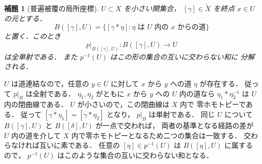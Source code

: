 \documentclass[a5paper,10pt,onecolumn]{jsarticle}
\makeatletter
\theoremstyle{mathnotetheorem}
\newtheorem{lemma}[theorem]{補題}
\renewcommand{\proofname}{証明}
\renewenvironment{proof}[1][\proofname]{%
  \par\pushQED{\qed}\normalfont\topsep4\p@\@plus2\p@\relax
  \trivlist\item[\hskip\labelsep\bfseries #1]\ignorespaces
}{\popQED\endtrivlist\@endpefalse}
\makeatother
\begin{document}
\begin{lemma}[普遍被覆の局所座標]\label{lem:universal-local}
$U\subset X$ を小さい開集合，
$[\gamma]\in\widetilde X$ を終点 $x\in U$ の元とする．
\[
 B([\gamma],U)=
 \{[\gamma*\eta]:
  \eta\text{ は }U\text{ 内の }x\text{ からの道}\}
\]
と置く．このとき
\[
 p|_{B([\gamma],U)}:B([\gamma],U)\to U
\]
は全単射である．
また $p^{-1}(U)$ はこの形の集合の互いに交わらない和に
分解される．
\end{lemma}
\begin{proof}
$U$ は道連結なので，任意の $y\in U$ に対して
$x$ から $y$ への道 $\eta$ が存在する．
従って $p|_B$ は全射である．
$\eta_1,\eta_2$ がともに $x$ から $y$ への
$U$ 内の道なら
$\eta_1*\eta_2^{-1}$ は $U$ 内の閉曲線である．
$U$ が小さいので，この閉曲線は $X$ 内で
零ホモトピーである．
従って $[\gamma*\eta_1]=[\gamma*\eta_2]$ となり，
$p|_B$ は単射である．
同じ $U$ について
$B([\gamma],U)$ と $B([\delta],U)$ が一点で交われば，
両者の基準となる経路の差が $U$ 内の道を介して
$X$ 内で零ホモトピーとなるため二つの集合は一致する．
交わらなければ互いに素である．
任意の $[\eta]\in p^{-1}(U)$ は
$B([\eta],U)$ に属するので，
$p^{-1}(U)$ はこのような集合の互いに交わらない和となる．
\end{proof}
\end{document}
